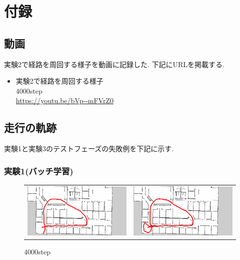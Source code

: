 \chapter*{付録}
\section*{動画}
実験2で経路を周回する様子を動画に記録した. 下記にURLを掲載する.
\begin{itemize}
  \item 実験2で経路を周回する様子 \\ 4000step \\ \url{https://youtu.be/bVp--mFVrZ0}
\end{itemize}

\newpage
\section*{走行の軌跡}
実験1と実験3のテストフェーズの失敗例を下記に示す.
\subsection*{実験1(バッチ学習)}

\begin{figure}[h]
  \begin{tabular}{cc}
    \begin{minipage}[h]{0.45\hsize}
      \centering
      \includegraphics[keepaspectratio, scale=0.3]{images/exp1.2_4000_2.png}
    \end{minipage} &
    \begin{minipage}[h]{0.45\hsize}
      \centering
      \includegraphics[keepaspectratio, scale=0.3]{images/exp1.2_4000_8.png}
    \end{minipage} \\
  \end{tabular}
   \caption*{4000step}
\end{figure}

